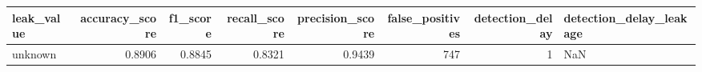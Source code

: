 \begin{tabular}{lrrrrrrl}
\toprule
leak\_value & accuracy\_score & f1\_score & recall\_score & precision\_score & false\_positives & detection\_delay & detection\_delay\_leakage \\
\midrule
unknown & 0.8906 & 0.8845 & 0.8321 & 0.9439 & 747 & 1 & NaN \\
\bottomrule
\end{tabular}
